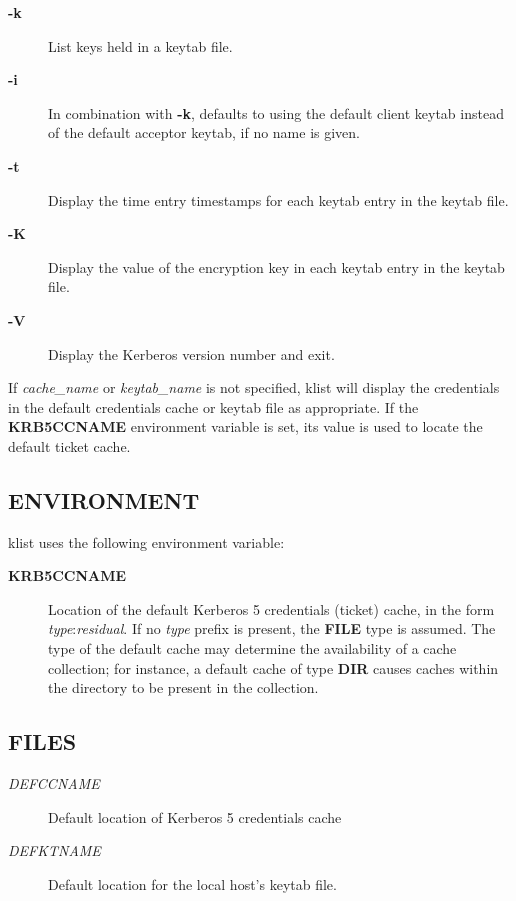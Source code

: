 \documentclass[letterpaper,10pt,english]{sphinxmanual}
\begin{document}
\begin{description}
\item[{\textbf{-k}}] \leavevmode
List keys held in a keytab file.

\item[{\textbf{-i}}] \leavevmode
In combination with \textbf{-k}, defaults to using the default client
keytab instead of the default acceptor keytab, if no name is
given.

\item[{\textbf{-t}}] \leavevmode
Display the time entry timestamps for each keytab entry in the
keytab file.

\item[{\textbf{-K}}] \leavevmode
Display the value of the encryption key in each keytab entry in
the keytab file.

\item[{\textbf{-V}}] \leavevmode
Display the Kerberos version number and exit.

\end{description}

If \emph{cache\_name} or \emph{keytab\_name} is not specified, klist will display
the credentials in the default credentials cache or keytab file as
appropriate.  If the \textbf{KRB5CCNAME} environment variable is set, its
value is used to locate the default ticket cache.


\subsection{ENVIRONMENT}
\label{user/user_commands/klist:environment}
klist uses the following environment variable:
\begin{description}
\item[{\textbf{KRB5CCNAME}}] \leavevmode
Location of the default Kerberos 5 credentials (ticket) cache, in
the form \emph{type}:\emph{residual}.  If no \emph{type} prefix is present, the
\textbf{FILE} type is assumed.  The type of the default cache may
determine the availability of a cache collection; for instance, a
default cache of type \textbf{DIR} causes caches within the directory
to be present in the collection.

\end{description}


\subsection{FILES}
\label{user/user_commands/klist:files}\begin{description}
\item[{\emph{DEFCCNAME}}] \leavevmode
Default location of Kerberos 5 credentials cache

\item[{\emph{DEFKTNAME}}] \leavevmode
Default location for the local host's keytab file.

\end{description}
\end{document}
